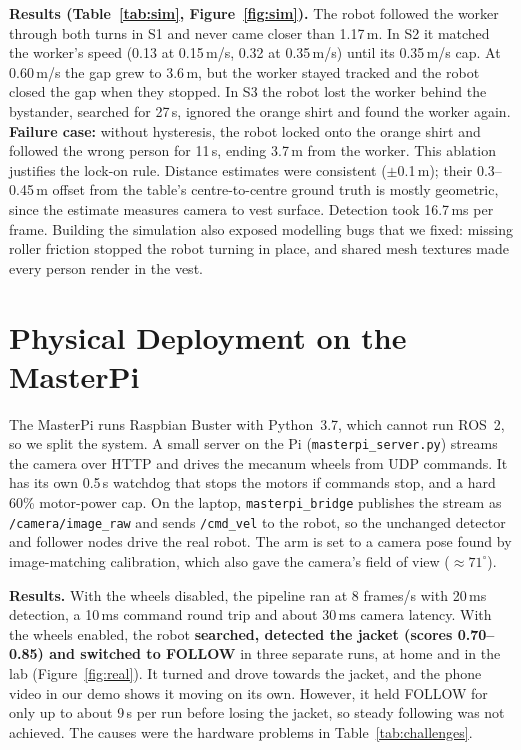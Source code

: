 \documentclass[10pt]{article}
\begin{document}
\textbf{Results (Table~\ref{tab:sim}, Figure~\ref{fig:sim}).} The robot followed the worker through both turns in S1 and never came closer than 1.17\,m. In S2 it matched the worker's speed (0.13 at 0.15\,m/s, 0.32 at 0.35\,m/s) until its 0.35\,m/s cap. At 0.60\,m/s the gap grew to 3.6\,m, but the worker stayed tracked and the robot closed the gap when they stopped. In S3 the robot lost the worker behind the bystander, searched for 27\,s, ignored the orange shirt and found the worker again. \textbf{Failure case:} without hysteresis, the robot locked onto the orange shirt and followed the wrong person for 11\,s, ending 3.7\,m from the worker. This ablation justifies the lock-on rule. Distance estimates were consistent ($\pm$0.1\,m); their 0.3--0.45\,m offset from the table's centre-to-centre ground truth is mostly geometric, since the estimate measures camera to vest surface. Detection took 16.7\,ms per frame. Building the simulation also exposed modelling bugs that we fixed: missing roller friction stopped the robot turning in place, and shared mesh textures made every person render in the vest.

\section{Physical Deployment on the MasterPi}
The MasterPi runs Raspbian Buster with Python~3.7, which cannot run ROS~2, so we split the system. A small server on the Pi (\texttt{masterpi\_server.py}) streams the camera over HTTP and drives the mecanum wheels from UDP commands. It has its own 0.5\,s watchdog that stops the motors if commands stop, and a hard 60\% motor-power cap. On the laptop, \texttt{masterpi\_bridge} publishes the stream as \texttt{/camera/image\_raw} and sends \texttt{/cmd\_vel} to the robot, so the unchanged detector and follower nodes drive the real robot. The arm is set to a camera pose found by image-matching calibration, which also gave the camera's field of view ($\approx71^\circ$).

\textbf{Results.} With the wheels disabled, the pipeline ran at 8 frames/s with 20\,ms detection, a 10\,ms command round trip and about 30\,ms camera latency. With the wheels enabled, the robot \textbf{searched, detected the jacket (scores 0.70--0.85) and switched to FOLLOW} in three separate runs, at home and in the lab (Figure~\ref{fig:real}). It turned and drove towards the jacket, and the phone video in our demo shows it moving on its own. However, it held FOLLOW for only up to about 9\,s per run before losing the jacket, so steady following was not achieved. The causes were the hardware problems in Table~\ref{tab:challenges}.
\end{document}
